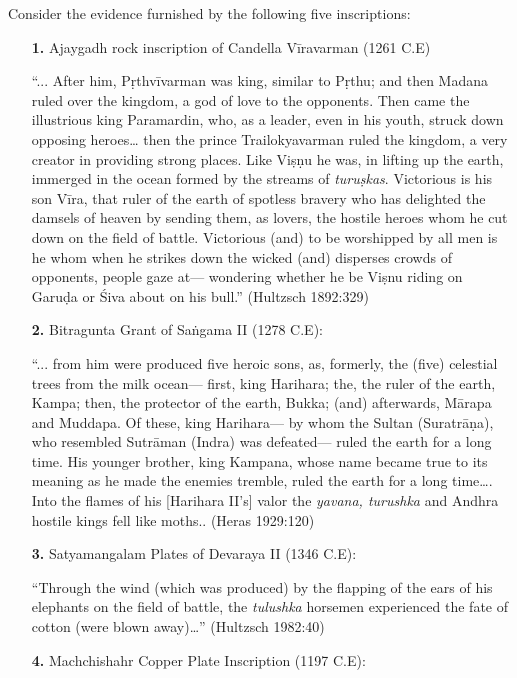 Consider the evidence furnished by the following five inscriptions: 
\begin{itemize}
\itemsep=0pt
\item[{\bf 1.}] Ajaygadh rock inscription of Candella Vīravarman (1261 C.E) 

“... After him, Pṛthvīvarman was king, similar to Pṛthu; and then Madana ruled over the kingdom, a god of love to the opponents. Then came the illustrious king Paramardin, who, as a leader, even in his youth, struck down opposing heroes… then the prince Trailokyavarman ruled the kingdom, a very creator in providing strong places. Like Viṣṇu he was, in lifting up the earth, immerged in the ocean formed by the streams of {\sl turuṣkas}. Victorious is his son Vīra, that ruler of the earth of spotless bravery who has delighted the damsels of heaven by sending them, as lovers, the hostile heroes whom he cut down on the field of battle. Victorious (and) to be worshipped by all men is he whom when he strikes down the wicked (and) disperses crowds of opponents, people gaze at— wondering whether he be Viṣnu riding on Garuḍa or Śiva about on his bull.” 
\hfill (Hultzsch 1892:329)

\item[{\bf 2.}] Bitragunta Grant of Saṅgama II (1278 C.E): 

“... from him were produced five heroic sons, as, formerly, the (five) celestial trees from the milk ocean— first, king Harihara; the, the ruler of the earth, Kampa; then, the protector of the earth, Bukka; (and) afterwards, Mārapa and Muddapa. Of these, king Harihara— by whom the Sultan (Suratrāṇa), who resembled Sutrāman (Indra) was defeated— ruled the earth for a long time. His younger brother, king Kampana, whose name became true to its meaning as he made the enemies tremble, ruled the earth for a long time…. Into the flames of his [Harihara II’s] valor the {\sl yavana, turushka} and Andhra hostile kings fell like moths.. (Heras 1929:120) 

\item[{\bf 3.}] Satyamangalam Plates of Devaraya II (1346 C.E): 

“Through the wind (which was produced) by the flapping of the ears of his elephants on the field of battle, the {\sl tulushka} horsemen experienced the fate of cotton (were blown away)…” (Hultzsch 1982:40)

\item[{\bf 4.}] Machchishahr Copper Plate Inscription (1197 C.E): 


\end{itemize}
